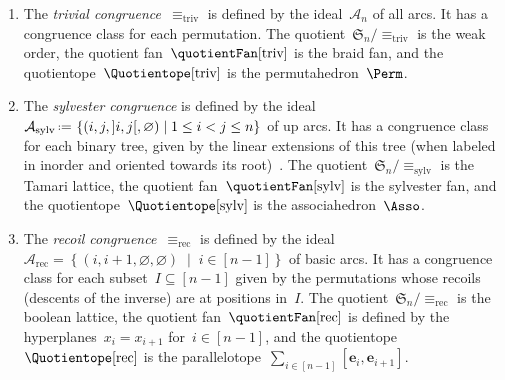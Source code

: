 \documentclass{amsart}
\theoremstyle{definition}
\newcommand{\f}[1]{{\mathfrak{#1}}} %
\renewcommand{\b}[1]{{\boldsymbol{#1}}} %
\newcommand{\set}[2]{\left\{ #1 \;\middle|\; #2 \right\}} %
\newcommand{\eqdef}{\mbox{\,\raisebox{0.2ex}{\scriptsize\ensuremath{\mathrm:}}\ensuremath{=}\,}} %
\newcommand{\darkblue}{\color{darkblue}} %
\newcommand{\defn}[1]{\textsl{\darkblue #1}} %
\newcommand{\arcs}{{\mathcal{A}}} %
\begin{document}
\begin{enumerate}
\item \label{item:trivialCongruence}
The \defn{trivial congruence}~$\equiv_\textrm{triv}$ is defined by the ideal~$\arcs_n$ of all arcs.
It has a congruence class for each permutation.
The quotient~$\f{S}_n/{\equiv_\textrm{triv}}$ is the weak order, the quotient fan~$\quotientFan[\textrm{triv}]$ is the braid fan, and the quotientope~$\Quotientope[\textrm{triv}]$ is the permutahedron~$\Perm$.

\item \label{item:sylvesterCongruence}
The \defn{sylvester congruence} is defined by the ideal~$\arcs_\textrm{sylv} \eqdef \set{(i, j, {]i,j[}, \varnothing)}{1 \le i < j \le n}$ of up arcs.
It has a congruence class for each binary tree, given by the linear extensions of this tree (when labeled in inorder and oriented towards its root)~\cite{Tonks, HivertNovelliThibon-algebraBinarySearchTrees}.
The quotient~$\f{S}_n/{\equiv_\textrm{sylv}}$ is the Tamari lattice, the quotient fan~$\quotientFan[\textrm{sylv}]$ is the sylvester fan, and the quotientope~$\Quotientope[\textrm{sylv}]$ is the associahedron~$\Asso$.

\item \label{item:recoilCongruence}
The \defn{recoil congruence}~$\equiv_\textrm{rec}$ is defined by the ideal~$\arcs_\textrm{rec} = \set{(i, i+1, \varnothing, \varnothing)}{i \in [n-1]}$ of basic arcs.
It has a congruence class for each subset~$I \subseteq [n-1]$ given by the permutations whose recoils (descents of the inverse) are at positions in~$I$.
The quotient~$\f{S}_n/{\equiv_\textrm{rec}}$ is the boolean lattice, the quotient fan~$\quotientFan[\textrm{rec}]$ is defined by the hyperplanes~$x_i = x_{i+1}$ for~$i \in [n-1]$, and the quotientope~$\Quotientope[\textrm{rec}]$ is the parallelotope~$\sum_{i \in [n-1]} [\b{e}_i, \b{e}_{i+1}]$.


\end{enumerate}
\end{document}
